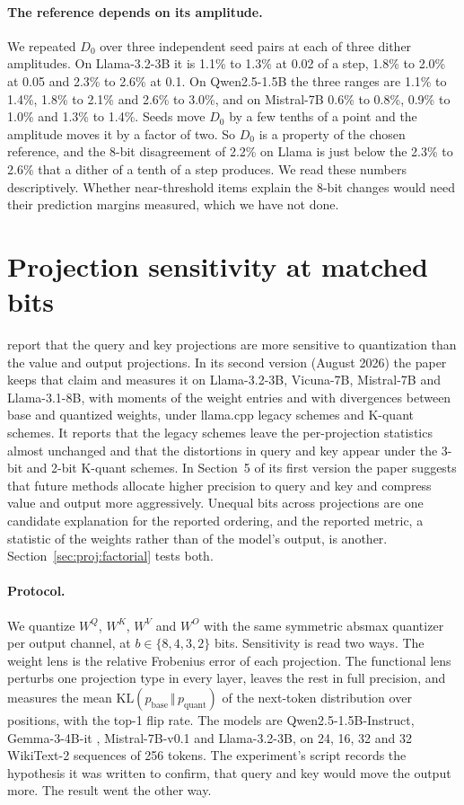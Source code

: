 \documentclass[10pt]{article}
\newcommand{\KL}{\mathrm{KL}}
\begin{document}
\paragraph{The reference depends on its amplitude.} We repeated $D_0$ over three independent
seed pairs at each of three dither amplitudes. On Llama-3.2-3B it is 1.1\% to 1.3\% at 0.02 of a
step, 1.8\% to 2.0\% at 0.05 and 2.3\% to 2.6\% at 0.1. On Qwen2.5-1.5B the three ranges are 1.1\%
to 1.4\%, 1.8\% to 2.1\% and 2.6\% to 3.0\%, and on Mistral-7B 0.6\% to 0.8\%, 0.9\% to 1.0\% and
1.3\% to 1.4\%. Seeds move $D_0$ by a few tenths of a point and the amplitude moves it by a factor
of two. So $D_0$ is a property of the chosen reference, and the 8-bit disagreement of 2.2\% on
Llama is just below the 2.3\% to 2.6\% that a dither of a tenth of a step produces. We read these numbers
descriptively. Whether near-threshold items explain the 8-bit changes would need their
prediction margins measured, which we have not done.

\section{Projection sensitivity at matched bits}\label{sec:proj}

\citet{rababah2026illusion} report that the query and key projections are more sensitive to
quantization than the value and output projections. In its second version (August 2026) the
paper keeps that claim and measures it on Llama-3.2-3B, Vicuna-7B, Mistral-7B and Llama-3.1-8B,
with moments of the weight entries and with divergences between base and quantized weights,
under llama.cpp legacy schemes and K-quant schemes. It reports that the legacy schemes leave
the per-projection statistics almost unchanged and that the distortions in query and key appear
under the 3-bit and 2-bit K-quant schemes. In Section~5 of its first version the paper suggests that future methods allocate higher
precision to query and key and compress value and output more aggressively. Unequal bits across projections are one
candidate explanation for the reported ordering, and the reported metric, a statistic of the
weights rather than of the model's output, is another. Section~\ref{sec:proj:factorial} tests
both.

\paragraph{Protocol.} We quantize $W^Q$, $W^K$, $W^V$ and $W^O$ with the same symmetric absmax
quantizer per output channel, at $b \in \{8,4,3,2\}$ bits. Sensitivity is read two ways. The
weight lens is the relative Frobenius error of each projection. The functional lens perturbs
one projection type in every layer, leaves the rest in full precision, and measures the mean
$\KL(p_{\text{base}}\,\Vert\,p_{\text{quant}})$ of the next-token distribution over
positions, with the top-1 flip rate. The models are Qwen2.5-1.5B-Instruct, Gemma-3-4B-it
\citep{gemma2025gemma3}, Mistral-7B-v0.1 and Llama-3.2-3B, on 24, 16, 32 and 32 WikiText-2
sequences of 256 tokens. The experiment's script records the hypothesis it was written to
confirm, that query and key would move the output more. The result went the other way.
\end{document}

